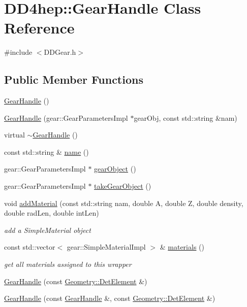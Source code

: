 \hypertarget{class_d_d4hep_1_1_gear_handle}{
\section{DD4hep::GearHandle Class Reference}
\label{class_d_d4hep_1_1_gear_handle}
}


{\ttfamily \#include $<$DDGear.h$>$}\subsection*{Public Member Functions}
\begin{DoxyCompactItemize}
\item 
\hyperlink{class_d_d4hep_1_1_gear_handle_a782739bfe116441082e6b4597bb6bf6e}{GearHandle} ()
\item 
\hyperlink{class_d_d4hep_1_1_gear_handle_adeb098c8edf707d3d122de032ff476fd}{GearHandle} (gear::GearParametersImpl $\ast$gearObj, const std::string \&nam)
\item 
virtual \hyperlink{class_d_d4hep_1_1_gear_handle_a7b8b36839e741d9d3e4bb22f44262f01}{$\sim$GearHandle} ()
\item 
const std::string \& \hyperlink{class_d_d4hep_1_1_gear_handle_acb3a333f73bd074c0d91bc453ae85cc0}{name} ()
\item 
gear::GearParametersImpl $\ast$ \hyperlink{class_d_d4hep_1_1_gear_handle_aaa9e8fbe619ab3a1a45fac04773e6c9a}{gearObject} ()
\item 
gear::GearParametersImpl $\ast$ \hyperlink{class_d_d4hep_1_1_gear_handle_a6dc3d8b5eaadccd2a6fa8c8e31739cbd}{takeGearObject} ()
\item 
void \hyperlink{class_d_d4hep_1_1_gear_handle_ae5f3ea169e473f5f0bd46f8d27d5d170}{addMaterial} (const std::string nam, double A, double Z, double density, double radLen, double intLen)
\begin{DoxyCompactList}\small\item\em add a SimpleMaterial object \item\end{DoxyCompactList}\item 
const std::vector$<$ gear::SimpleMaterialImpl $>$ \& \hyperlink{class_d_d4hep_1_1_gear_handle_ae127a028091e597d755f33c1d1303032}{materials} ()
\begin{DoxyCompactList}\small\item\em get all materials assigned to this wrapper \item\end{DoxyCompactList}\item 
\hyperlink{class_d_d4hep_1_1_gear_handle_a08d410c5f9ea89384c3166fe42f0bae8}{GearHandle} (const \hyperlink{class_d_d4hep_1_1_geometry_1_1_det_element}{Geometry::DetElement} \&)
\item 
\hyperlink{class_d_d4hep_1_1_gear_handle_a7b88ea01bf9e0fb58e7df2997c8825fb}{GearHandle} (const \hyperlink{class_d_d4hep_1_1_gear_handle}{GearHandle} \&, const \hyperlink{class_d_d4hep_1_1_geometry_1_1_det_element}{Geometry::DetElement} \&)
\end{DoxyCompactItemize}
